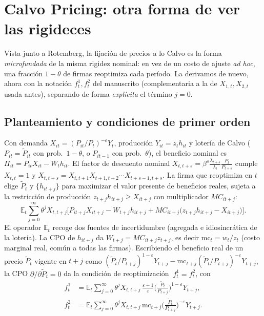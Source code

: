 \documentclass[11pt]{article}
\theoremstyle{definition}
\newcommand{\E}{\mathbb{E}}
\newcommand{\mc}{\mathrm{mc}}
\begin{document}
\section{Calvo Pricing: otra forma de ver las rigideces}

Vista junto a Rotemberg, la fijación de precios a lo Calvo es la forma \emph{microfundada} de la misma
rigidez nominal: en vez de un costo de ajuste \emph{ad hoc}, una fracción $1-\theta$ de firmas
reoptimiza cada período. La derivamos de nuevo, ahora con la notación $f^{1}_{t},f^{2}_{t}$ del
manuscrito (complementaria a la de $X_{1,t},X_{2,t}$ usada antes), separando de forma \emph{explícita}
el término $j=0$.

\subsection{Planteamiento y condiciones de primer orden}

Con demanda $X_{it}=(P_{it}/P_{t})^{-\varepsilon}Y_{t}$, producción $Y_{it}=z_{t}h_{it}$ y lotería de
Calvo ($P_{it}=\widetilde{P}_{it}$ con prob.\ $1-\theta$, o $P_{it-1}$ con prob.\ $\theta$), el
beneficio nominal es $\Pi_{it}=P_{it}X_{it}-W_{t}h_{it}$. El factor de descuento nominal
$X_{t,t+s}=\beta^{s}\tfrac{\lambda_{t+s}}{\lambda_{t}}\tfrac{P_{t}}{P_{t+s}}$ cumple $X_{t,t}=1$ y
$X_{t,t+s}=X_{t,t+1}X_{t+1,t+2}\cdots X_{t+s-1,t+s}$. La firma que reoptimiza en $t$ elige
$\widetilde{P}_{t}$ y $\{h_{it+j}\}$ para maximizar el valor presente de beneficios reales, sujeta a la
restricción de producción $z_{t+j}h_{it+j}\ge X_{it+j}$ con multiplicador $MC_{it+j}$:
\begin{equation}
\E_{t}\sum_{j=0}^{\infty}\theta^{j}X_{t,t+j}\Big[P_{it+j}X_{it+j}-W_{t+j}h_{it+j}
+MC_{it+j}\big(z_{t+j}h_{it+j}-X_{it+j}\big)\Big].
\end{equation}
El operador $\E_{t}$ recoge dos fuentes de incertidumbre (agregada e idiosincrática de la lotería). La
CPO de $h_{it+j}$ da $W_{t+j}=MC_{it+j}z_{t+j}$, es decir $\mc_{t}=w_{t}/z_{t}$ (costo marginal real,
común a todas las firmas). Escribiendo el beneficio real de un precio $\widetilde{P}_{t}$ vigente en
$t+j$ como $(\widetilde{P}_{t}/P_{t+j})^{1-\varepsilon}Y_{t+j}-\mc_{t+j}(\widetilde{P}_{t}/P_{t+j})^{-\varepsilon}Y_{t+j}$,
la CPO $\partial/\partial\widetilde{P}_{t}=0$ da la condición de reoptimización $\ f^{1}_{t}=f^{2}_{t}$,
con
\begin{align}
f^{1}_{t}&=\E_{t}\sum_{j=0}^{\infty}\theta^{j}X_{t,t+j}\,\frac{\varepsilon-1}{\varepsilon}\Big(\frac{\widetilde{P}_{t}}{P_{t+j}}\Big)^{1-\varepsilon}Y_{t+j},\\
f^{2}_{t}&=\E_{t}\sum_{j=0}^{\infty}\theta^{j}X_{t,t+j}\,\mc_{t+j}\Big(\frac{\widetilde{P}_{t}}{P_{t+j}}\Big)^{-\varepsilon}Y_{t+j}.
\end{align}
\end{document}
